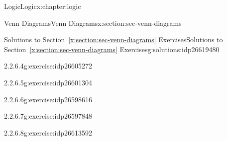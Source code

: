 \documentclass[twoside,10pt,]{book}
\newcommand{\xreffont}{\relax}
\numberwithin{equation}{section}
\begin{document}
\begin{chapterptx}{Logic}{}{Logic}{}{}{x:chapter:logic}
\begin{sectionptx}{Venn Diagrams}{}{Venn Diagrams}{}{}{x:section:sec-venn-diagrams}
\begin{solutions-subsection}{Solutions to Section~{\xreffont\ref*{x:section:sec-venn-diagrams}} Exercises}{}{Solutions to Section~{\xreffont\ref*{x:section:sec-venn-diagrams}} Exercises}{}{}{g:solutions:idp26619480}
\begin{exercisegroup}
\begin{divisionsolutioneg}{2.2.6.4}{}{g:exercise:idp26605272}
\begin{image}{0.3}{0.4}{0.3}
\resizebox{\linewidth}{!}{%
\begin{venndiagram2sets}[labelA={$p$},labelB={$q$}]
  \fillNotA
  \fillB
\end{venndiagram2sets}
}%
\end{image}%
\end{divisionsolutioneg}%
\begin{divisionsolutioneg}{2.2.6.5}{}{g:exercise:idp26601304}%
\par\smallskip%
\noindent\hypertarget{g:solution:idp26605400-main}{}\begin{image}{0.3}{0.4}{0.3}%
\resizebox{\linewidth}{!}{%
\begin{venndiagram2sets}[labelA={$p$},labelB={$q$}]
  \fillNotAorB
\end{venndiagram2sets}
}%
\end{image}%
\end{divisionsolutioneg}%
\begin{divisionsolutioneg}{2.2.6.6}{}{g:exercise:idp26598616}%
\par\smallskip%
\noindent\hypertarget{g:solution:idp26599896-main}{}\begin{image}{0.3}{0.4}{0.3}%
\resizebox{\linewidth}{!}{%
\begin{venndiagram2sets}[labelA={$p$},labelB={$q$}]
  \fillACapB
\end{venndiagram2sets}
}%
\end{image}%
\end{divisionsolutioneg}%
\begin{divisionsolutioneg}{2.2.6.7}{}{g:exercise:idp26597848}%
\par\smallskip%
\noindent\hypertarget{g:solution:idp26604376-main}{}\begin{image}{0.3}{0.4}{0.3}%
\resizebox{\linewidth}{!}{%
\begin{venndiagram2sets}[labelA={$p$},labelB={$q$}]
  \fillA
\end{venndiagram2sets}
}%
\end{image}%
\end{divisionsolutioneg}%
\end{exercisegroup}
\par\medskip\noindent
\begin{exercisegroup}
\begin{divisionsolutioneg}{2.2.6.8}{}{g:exercise:idp26613592}%
\par\smallskip%
\noindent\hypertarget{g:solution:idp26609496-main}{}\begin{image}{0.3}{0.4}{0.3}%
\resizebox{\linewidth}{!}{%
}
\end{image}
\end{divisionsolutioneg}
\end{exercisegroup}
\end{solutions-subsection}
\end{sectionptx}
\end{chapterptx}
\end{document}
